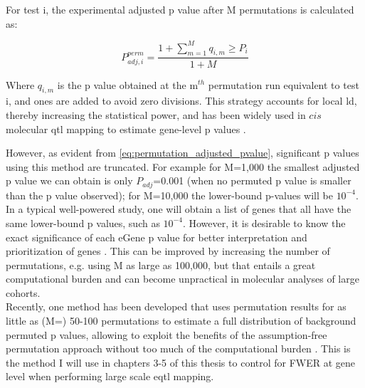 For test i, the experimental adjusted p value after M permutations is calculated as:

\begin{equation}\label{eq:permutation_adjusted_pvalue}
    P_{adj,i}^{perm} = \frac{1+\sum_{m=1}^{M} q_{i,m} \geq P_i}{1+M}
\end{equation}

Where $q_{i,m}$ is the p value obtained at the m$^{th}$ permutation run equivalent to test i, and ones are added to avoid zero divisions.  
This strategy accounts for local \gls{ld}, thereby increasing the statistical power, and has been widely used in $cis$ molecular \gls{qtl} mapping to estimate gene-level p values \cite{gtex2015genotype}.  


However, as evident from \eqref{eq:permutation_adjusted_pvalue}, significant p values using this method are truncated.
For example for M=1,000 the smallest adjusted p value we can obtain is only $P_{adj}$=0.001 (when no permuted p value is smaller than the p value observed); for M=10,000 the lower-bound p-values will be $10^{-4}$. 
In a typical well-powered study, one will obtain a list of genes that all have the same lower-bound p values, such as $10^{-4}$. 
However, it is desirable to know the exact significance of each eGene p value for better interpretation and prioritization of genes \cite{sul2015accurate}.
This can be improved by increasing the number of permutations, e.g. using M as large as 100,000, but that entails a great computational burden and can become unpractical in molecular analyses of large cohorts.\\

Recently, one method has been developed that uses permutation results for as little as (M=) 50-100 permutations to estimate a full distribution of background permuted p values, allowing to exploit the benefits of the assumption-free permutation approach without too much of the computational burden \cite{ongen2016fast}. 
This is the method I will use in chapters 3-5 of this thesis to control for FWER at gene level when performing large scale e\gls{qtl} mapping.


